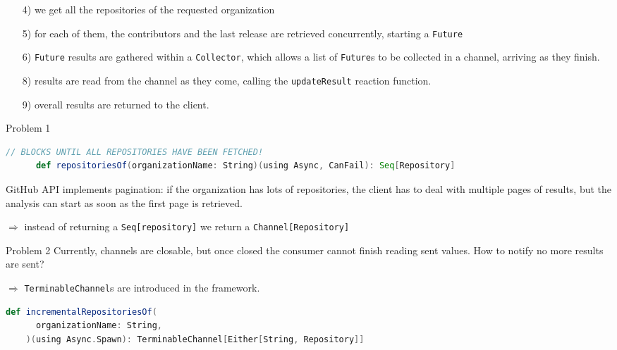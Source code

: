 \documentclass[aspectratio=1610,xcolor=dvipsnames,handout]{beamer}
\begin{document}
%
\begin{frame}
  
  \footnotesize
  \begin{enumerate}
      \item[4)] we get all the repositories of the requested organization
      \item[5)] for each of them, the contributors and the last release are retrieved concurrently, starting a \texttt{Future}
      \item[6)] \texttt{Future} results are gathered within a \texttt{Collector}, which allows a list of \texttt{Future}s to be collected in a channel, arriving as they finish.
      \item[8)] results are read from the channel as they come, calling the \texttt{updateResult} reaction function.
      \item[9)] overall results are returned to the client.
  \end{enumerate}
\end{frame}
%
\begin{frame}[fragile]
  \begin{alertblock}{Problem 1}
    \begin{lstlisting}[language=scala, gobble=6]
      // BLOCKS UNTIL ALL REPOSITORIES HAVE BEEN FETCHED!
      def repositoriesOf(organizationName: String)(using Async, CanFail): Seq[Repository]
    \end{lstlisting}
    \small
    GitHub API implements pagination: if the organization has lots of repositories, the client has to deal with multiple pages of results, but the analysis can start as soon as the first page is retrieved.
  \end{alertblock}
  \pause
  \small$\Rightarrow$ instead of returning a \texttt{Seq[repository]} we return a \texttt{Channel[Repository]}
  \pause
  \begin{alertblock}{Problem 2}
      \small
      Currently, channels are closable, but once closed the consumer cannot finish reading sent values. How to notify no more results are sent?
  \end{alertblock}
  \pause
  \small$\Rightarrow$ \texttt{TerminableChannel}s are introduced in the framework.
  \begin{lstlisting}[language=scala, gobble=4]
    def incrementalRepositoriesOf(
      organizationName: String,
    )(using Async.Spawn): TerminableChannel[Either[String, Repository]]
  \end{lstlisting}
\end{frame}
\end{document}
